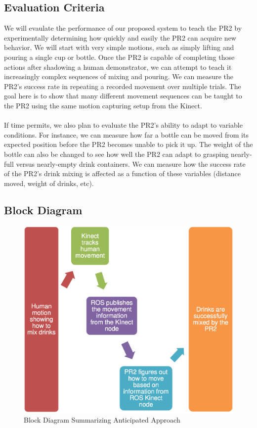 \documentclass{sig-alternate}
\begin{document}
\subsection{Evaluation Criteria}
\label{subsec:eval_criteria}
We will evaulate the performance of our proposed system to teach the PR2 by experimentally determining how quickly and easily the PR2
can acquire new behavior. We will start with very simple motions, such as simply lifting and pouring a single cup or bottle. Once the PR2 is capable of completing those actions after shadowing a human demonstrator, we can attempt to teach it increasingly complex sequences of mixing and pouring. We can measure the PR2's success rate in repeating a recorded movement over multiple trials. The goal here is to show that many different movement sequences can be taught to the PR2 using the same motion capturing setup from the Kinect.\\
\\
If time permits, we also plan to evaluate the PR2's ability to adapt to variable conditions. For instance, we can measure how far a bottle can be moved from its expected position before the PR2 becomes unable to pick it up. The weight of the bottle can also be changed to see how well the PR2 can adapt to grasping nearly-full versus nearly-empty drink containers. We can measure how the success rate of the PR2's drink mixing is affected as a function of these variables (distance moved, weight of drinks, etc).
\subsection{Block Diagram}
\label{subsec:block_diagram}

\begin{figure}[h!] 
	\begin{center}
		\includegraphics[width=0.9\linewidth]{flowchart}
	\end{center}
	\caption{Block Diagram Summarizing Anticipated Approach}
	\label{fig:some_graph}
\end{figure}
\end{document}
